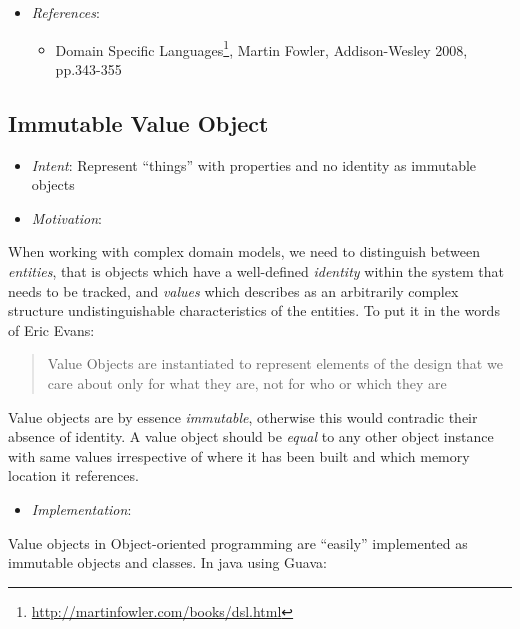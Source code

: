 \documentclass[11pt,]{article}
\renewcommand{\href}[2]{#2\footnote{\url{#1}}}
\begin{document}
\begin{itemize}
\item
  \emph{References}:

  \begin{itemize}
  \item
    \href{http://martinfowler.com/books/dsl.html}{Domain Specific
    Languages}, Martin Fowler, Addison-Wesley 2008, pp.343-355
  \end{itemize}
\end{itemize}

\subsection{Immutable Value Object}

\begin{itemize}
\item
  \emph{Intent}: Represent ``things'' with properties and no identity as
  immutable objects
\item
  \emph{Motivation}:
\end{itemize}

When working with complex domain models, we need to distinguish between
\emph{entities}, that is objects which have a well-defined
\emph{identity} within the system that needs to be tracked, and
\emph{values} which describes as an arbitrarily complex structure
undistinguishable characteristics of the entities. To put it in the
words of Eric Evans:

\begin{quote}
Value Objects are instantiated to represent elements of the design that
we care about only for what they are, not for who or which they are
\end{quote}

Value objects are by essence \emph{immutable}, otherwise this would
contradic their absence of identity. A value object should be
\emph{equal} to any other object instance with same values irrespective
of where it has been built and which memory location it references.

\begin{itemize}
\item
  \emph{Implementation}:
\end{itemize}

Value objects in Object-oriented programming are ``easily'' implemented
as immutable objects and classes. In java using Guava:
\end{document}
